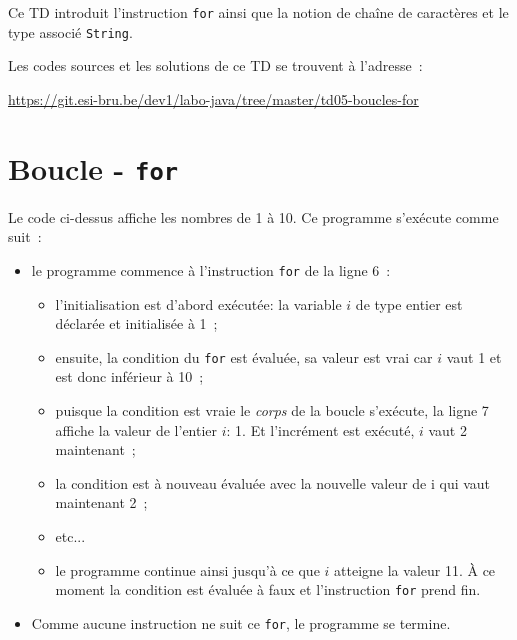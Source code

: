 \documentclass[a4paper,11pt]{article}
\date{2018 -- 2019}
\newcommand{\publicbasepath}{https://git.esi-bru.be/dev1/labo-java/tree/master/td05-boucles-for}
\begin{document}
\entete
\titre
{}
\lastedit


	Ce TD introduit l'instruction \texttt{for} ainsi que la notion de chaîne de caractères et le type
	associé \texttt{String}.
	
	Les codes sources et les solutions de ce TD se trouvent à l'adresse~: 
	
	\url{\publicbasepath}	


	 
	\tableofcontents

	\newpage

\section{Boucle - \texttt{for}}

	Le code ci-dessus affiche les nombres de 1 à 10.
	Ce programme s'exécute comme suit~:
	\begin{itemize}
		\item  le programme commence à l'instruction \texttt{for} de la ligne 6~:
			\begin{itemize}
				\item l'initialisation  est d'abord exécutée: 
					la variable $i$ de type entier est déclarée et initialisée à 1~;
				\item  ensuite, la condition du \texttt{for} 
					est évaluée, sa valeur est vrai car $i$ vaut 1 et est donc inférieur à 10~;
				\item puisque la condition est vraie le \emph{corps} de la boucle s'exécute, 
					la ligne 7 affiche la valeur de l'entier $i$: 1. 
					Et l'incrément  est exécuté, $i$ vaut 2 maintenant~;
				\item la condition est à nouveau évaluée avec la nouvelle valeur de i qui vaut maintenant 2~;
				\item etc...
				\item le programme continue ainsi jusqu'à ce que $i$ atteigne la valeur 11. 
					\`A ce moment la condition est évaluée à faux et l'instruction 
					\texttt{for} prend fin.
			\end{itemize}
		\item	Comme aucune instruction ne suit ce \texttt{for}, le programme se termine.

	\end{itemize}
\end{document}
